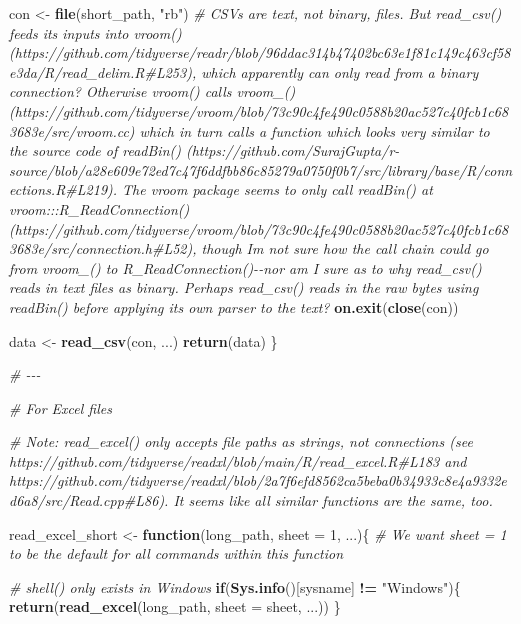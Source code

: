 \documentclass[
]{article}
\newenvironment{Shaded}{\begin{snugshade}}{\end{snugshade}}
\newcommand{\AttributeTok}[1]{\textcolor[rgb]{0.13,0.29,0.53}{#1}}
\newcommand{\CommentTok}[1]{\textcolor[rgb]{0.56,0.35,0.01}{\textit{#1}}}
\newcommand{\ControlFlowTok}[1]{\textcolor[rgb]{0.13,0.29,0.53}{\textbf{#1}}}
\newcommand{\DecValTok}[1]{\textcolor[rgb]{0.00,0.00,0.81}{#1}}
\newcommand{\FunctionTok}[1]{\textcolor[rgb]{0.13,0.29,0.53}{\textbf{#1}}}
\newcommand{\NormalTok}[1]{#1}
\newcommand{\OtherTok}[1]{\textcolor[rgb]{0.56,0.35,0.01}{#1}}
\newcommand{\SpecialCharTok}[1]{\textcolor[rgb]{0.81,0.36,0.00}{\textbf{#1}}}
\newcommand{\StringTok}[1]{\textcolor[rgb]{0.31,0.60,0.02}{#1}}
\begin{document}
\begin{Shaded}
\begin{Highlighting}[]
\NormalTok{  con }\OtherTok{\textless{}{-}} \FunctionTok{file}\NormalTok{(short\_path, }\StringTok{"rb"}\NormalTok{) }\CommentTok{\# CSVs are text, not binary, files. But read\_csv() feeds its inputs into vroom() (https://github.com/tidyverse/readr/blob/96ddac314b47402bc63e1f81c149c463cf58e3da/R/read\_delim.R\#L253), which apparently can only read from a binary connection? Otherwise vroom() calls vroom\_() (https://github.com/tidyverse/vroom/blob/73c90c4fe490c0588b20ac527c40fcb1c683683e/src/vroom.cc) which in turn calls a function which looks very similar to the source code of readBin() (https://github.com/SurajGupta/r{-}source/blob/a28e609e72ed7c47f6ddfbb86c85279a0750f0b7/src/library/base/R/connections.R\#L219). The vroom package seems to only call readBin() at vroom:::R\_ReadConnection() (https://github.com/tidyverse/vroom/blob/73c90c4fe490c0588b20ac527c40fcb1c683683e/src/connection.h\#L52), though I\textquotesingle{}m not sure how the call chain could go from vroom\_() to R\_ReadConnection(){-}{-}nor am I sure as to why read\_csv() reads in text files as binary. Perhaps read\_csv() reads in the raw bytes using readBin() before applying its own parser to the text?}
  \FunctionTok{on.exit}\NormalTok{(}\FunctionTok{close}\NormalTok{(con))}
  
\NormalTok{  data }\OtherTok{\textless{}{-}} \FunctionTok{read\_csv}\NormalTok{(con, ...)}
  \FunctionTok{return}\NormalTok{(data)}
\NormalTok{\}}

\CommentTok{\# {-}{-}{-}}

\CommentTok{\# For Excel files}

\CommentTok{\# Note: read\_excel() only accepts file paths as strings, not connections (see https://github.com/tidyverse/readxl/blob/main/R/read\_excel.R\#L183 and https://github.com/tidyverse/readxl/blob/2a7f6efd8562ca5beba0b34933c8e4a9332ed6a8/src/Read.cpp\#L86). It seems like all similar functions are the same, too.}

\NormalTok{read\_excel\_short }\OtherTok{\textless{}{-}} \ControlFlowTok{function}\NormalTok{(long\_path, }\AttributeTok{sheet =} \DecValTok{1}\NormalTok{, ...)\{ }\CommentTok{\# We want sheet = 1 to be the default for all commands within this function }
  
  \CommentTok{\# shell() only exists in Windows}
  \ControlFlowTok{if}\NormalTok{(}\FunctionTok{Sys.info}\NormalTok{()[}\StringTok{\textquotesingle{}sysname\textquotesingle{}}\NormalTok{] }\SpecialCharTok{!=} \StringTok{"Windows"}\NormalTok{)\{}
    \FunctionTok{return}\NormalTok{(}\FunctionTok{read\_excel}\NormalTok{(long\_path, }\AttributeTok{sheet =}\NormalTok{ sheet, ...))}
\NormalTok{  \}}
  

\end{Highlighting}
\end{Shaded}
\end{document}

